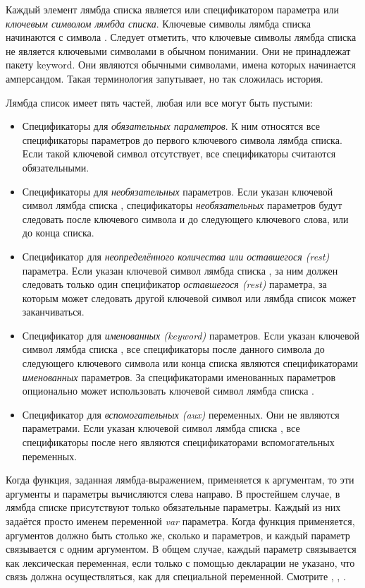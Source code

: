 Каждый элемент лямбда списка является или спецификатором параметра или \emph{ключевым
 символом лямбда списка}. Ключевые символы лямбда списка начинаются с символа
\cd{\&}.
Следует отметить, что ключевые символы лямбда списка не является ключевыми
символами в обычном понимании. Они не принадлежат пакету keyword. Они являются
обычными символами, имена которых начинается амперсандом. Такая терминология
запутывает, но так сложилась история.

Лямбда список имеет пять частей, любая или все могут быть пустыми:

\begin{itemize}

\item
Спецификаторы для \emph{обязательных параметров}. К ним относятся все
спецификаторы параметров до первого ключевого символа лямбда списка. Если такой
ключевой символ отсутствует, все спецификаторы считаются обязательными.

\item
Спецификаторы для \emph{необязательных} параметров.
Если указан ключевой символ лямбда списка , спецификаторы
\emph{необязательных} параметров будут следовать после ключевого символа
 и до следующего ключевого слова, или до конца списка.

\item
Спецификатор для \emph{неопределённого количества или оставшегося (rest)} параметра. Если указан ключевой символ
лямбда списка , за ним должен следовать только один спецификатор
\emph{оставшегося (rest)} параметра, за которым может следовать другой ключевой символ или
лямбда список может заканчиваться.

\item
Спецификатор для \emph{именованных (keyword)} параметров. Если указан ключевой
символ лямбда списка , все спецификаторы после данного символа до
следующего ключевого символа или конца списка являются спецификаторами
\emph{именованных} параметров. За спецификаторами именованных параметров
опционально может использовать ключевой символ лямбда списка .

\item
Спецификатор для \emph{вспомогательных (aux)} переменных. Они не являются
параметрами. Если указан ключевой символ лямбда списка , все
спецификаторы после него являются спецификаторами вспомогательных переменных.
\end{itemize}

Когда функция, заданная лямбда-выражением, применяется к аргументам, то эти
аргументы и параметры вычисляются слева направо.
В простейшем случае, в лямбда списке присутствуют только обязательные
параметры. Каждый из них задаётся просто именем переменной \emph{var}
параметра.
Когда функция применяется, аргументов должно быть столько же, сколько и
параметров, и каждый параметр связывается с одним аргументом. В общем случае,
каждый параметр связывается как лексическая переменная, если только с помощью
декларации не указано, что связь должна осуществляться, как для специальной
переменной. Смотрите , , .

